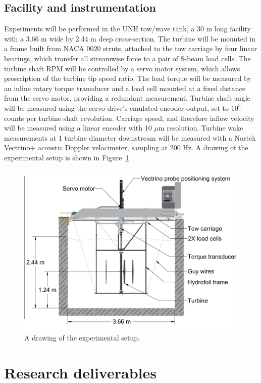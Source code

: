 \documentclass[12pt]{report}
\begin{document}
\section{Facility and instrumentation}

Experiments will be performed in the UNH tow/wave tank, a 30 m long facility
with a 3.66 m wide by 2.44 m deep cross-section. The turbine will be mounted in
a frame built from NACA 0020 struts, attached to the tow carriage by four linear
bearings, which transfer all streamwise force to a pair of S-beam load cells.
The turbine shaft RPM will be controlled by a servo motor system, which allows
prescription of the turbine tip speed ratio. The load torque will be measured by
an inline rotary torque transducer and a load cell mounted at a fixed distance
from the servo motor, providing a redundant measurement. Turbine shaft angle
will be measured using the servo drive's emulated encoder output, set to $10^5$
counts per turbine shaft revolution. Carriage speed, and therefore inflow
velocity will be measured using a linear encoder with 10 $\mu$m resolution.
Turbine wake measurements at 1 turbine diameter downstream will be measured with
a Nortek Vectrino+ acoustic Doppler velocimeter, sampling at 200 Hz. A drawing
of the experimental setup is shown in Figure~\ref{fig-exp_setup}.


\begin{figure}
\centering
\includegraphics[width=\textwidth]{Figures/tank_cross_section}
\caption{A drawing of the experimental setup.}
\label{fig-exp_setup}
\end{figure}


\chapter{Research deliverables}
\end{document}
